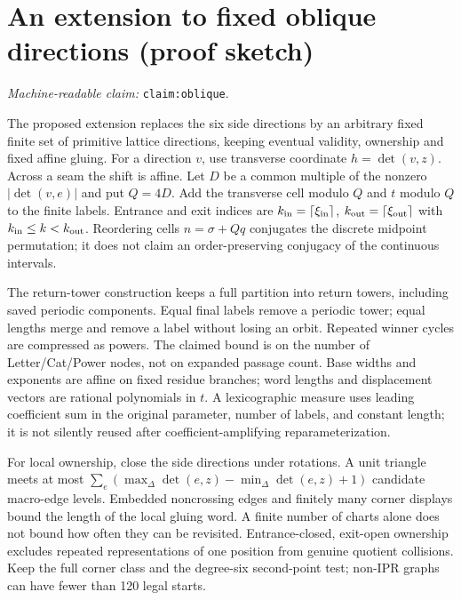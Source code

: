 \documentclass[11pt]{amsart}
\newcommand{\record}[1]{\nolinkurl{#1}}
\newcommand{\claimid}[1]{\par\nopagebreak\noindent\textit{Machine-readable claim:} \record{#1}.\par}
\theoremstyle{definition}\newtheorem{definition}{Definition}
\begin{document}
\label{sec:formal-records}
\section{An extension to fixed oblique directions (proof sketch)}\label{sec:extension}
\label{claim:oblique}\claimid{claim:oblique}
The proposed extension replaces the six side directions by an arbitrary
fixed finite set of primitive lattice directions, keeping eventual
validity, ownership and fixed affine gluing. For a direction $v$, use
transverse coordinate $h=\det(v,z)$. Across a seam the shift is affine.
Let $D$ be a common multiple of the nonzero $|\det(v,e)|$ and put
$Q=4D$. Add the transverse cell modulo $Q$ and $t$ modulo $Q$ to the
finite labels. Entrance and exit indices are
$k_{\rm in}=\lceil\xi_{\rm in}\rceil$,
$k_{\rm out}=\lceil\xi_{\rm out}\rceil$ with
$k_{\rm in}\le k<k_{\rm out}$. Reordering cells $n=\sigma+Qq$
conjugates the discrete midpoint permutation; it does not claim an
order-preserving conjugacy of the continuous intervals.

The return-tower construction keeps a full partition into return towers,
including saved periodic components. Equal final labels remove a
periodic tower; equal lengths merge and remove a label without losing
an orbit. Repeated winner cycles are compressed as powers. The claimed
bound is on the number of Letter/Cat/Power nodes, not on expanded
passage count. Base widths and exponents are affine on fixed residue
branches; word lengths and displacement vectors are rational
polynomials in $t$. A lexicographic measure uses leading coefficient
sum in the original parameter, number of labels, and constant length;
it is not silently reused after coefficient-amplifying reparameterization.

For local ownership, close the side directions under rotations. A
unit triangle meets at most
$\sum_e(\max_\Delta\det(e,z)-\min_\Delta\det(e,z)+1)$
candidate macro-edge levels. Embedded noncrossing edges and finitely
many corner displays bound the length of the local gluing word.
A finite number of charts alone does not bound how often they can
be revisited. Entrance-closed, exit-open ownership excludes repeated
representations of one position from genuine quotient collisions.
Keep the full corner class and the degree-six second-point test;
non-IPR graphs can have fewer than 120 legal starts.
\end{document}

